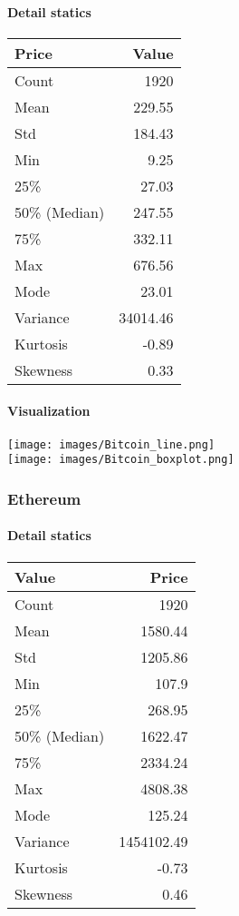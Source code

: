 \documentclass{ieeeojies}
\begin{document}
\paragraph{Detail statics}
\begin{center}
\begin{tabular}{|l|r|}
\hline
\textbf{Price} & \textbf{Value} \\
\hline
Count & 1920 \\
\hline
Mean & 229.55 \\
\hline
Std & 184.43 \\
\hline
Min & 9.25 \\
\hline
25\% & 27.03 \\
\hline
50\% (Median) & 247.55 \\
\hline
75\% & 332.11 \\
\hline
Max & 676.56 \\
\hline
Mode & 23.01 \\
\hline
Variance & 34014.46 \\
\hline
Kurtosis & -0.89 \\
\hline
Skewness & 0.33 \\
\hline
\end{tabular}
\end{center}
\paragraph{Visualization}
\texttt{[image: images/Bitcoin\_line.png]}\\
\texttt{[image: images/Bitcoin\_boxplot.png]}
\subsubsection{Ethereum}
\paragraph{Detail statics}
\begin{center}
\begin{tabular}{|l|r|}
\hline
\textbf{Value} & \textbf{Price} \\
\hline
Count &  1920 \\
\hline
Mean & 1580.44 \\
\hline
Std & 1205.86 \\
\hline
Min & 107.9  \\
\hline
25\% & 268.95 \\
\hline
50\% (Median) & 1622.47 \\
\hline
75\% & 2334.24 \\
\hline
Max & 4808.38 \\
\hline
Mode & 125.24 \\
\hline
Variance & 1454102.49 \\
\hline
Kurtosis & -0.73 \\
\hline
Skewness & 0.46 \\
\hline
\end{tabular}

\end{center}
\end{document}
